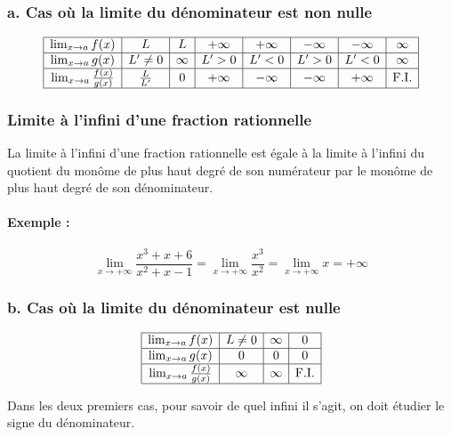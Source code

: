 \documentclass[12pt,a4paper]{article}
\begin{document}
\subsubsection*{\color{myred}a. Cas où la limite du dénominateur est non nulle}

\[
\begin{array}{|c|c|c|c|c|c|c|c|}
\hline
\lim_{x \to a} f(x) & L & L & +\infty & +\infty & -\infty & -\infty & \infty \\
\hline
\lim_{x \to a} g(x) & L' \neq 0 & \infty & L' > 0 & L' < 0 & L' > 0 & L' < 0 & \infty \\
\hline
\lim_{x \to a} \frac{f(x)}{g(x)} & \frac{L}{L'} & 0 & +\infty & -\infty & -\infty & +\infty & \text{F.I.} \\
\hline
\end{array}
\]

\subsubsection*{Limite à l'infini d'une fraction rationnelle}

La limite à l'infini d'une fraction rationnelle est égale à la limite à l'infini du quotient du monôme de plus haut degré de son numérateur par le monôme de plus haut degré de son dénominateur.


\paragraph{Exemple :}
\[
\lim_{x \to +\infty} \frac{x^3 + x + 6}{x^2 + x - 1} = \lim_{x \to +\infty} \frac{x^3}{x^2} = \lim_{x \to +\infty} x = +\infty
\]

\subsubsection*{\color{myred}b. Cas où la limite du dénominateur est nulle}

\[
\begin{array}{|c|c|c|c|}
\hline
\lim_{x \to a} f(x) & L \neq 0 & \infty & 0 \\
\hline
\lim_{x \to a} g(x) & 0 & 0 & 0 \\
\hline
\lim_{x \to a} \frac{f(x)}{g(x)} & \infty & \infty & \text{F.I.} \\
\hline
\end{array}
\]

Dans les deux premiers cas, pour savoir de quel infini il s'agit, on doit étudier le signe du dénominateur.
\end{document}
